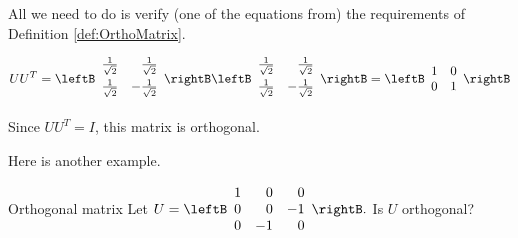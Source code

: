 \begin{solution}
All we need to do is verify (one of the equations from) the requirements of Definition \ref{def:OrthoMatrix}.

\begin{equation*}
UU^{T}=\leftB 
\begin{array}{rr}
\vspace{0.05in}\frac{1}{\sqrt{2}} & \frac{1}{\sqrt{2}} \\ 
\vspace{0.05in}\frac{1}{\sqrt{2}} & -\frac{1}{\sqrt{2}}
\end{array}
\rightB \leftB 
\begin{array}{rr}
\vspace{0.05in}\frac{1}{\sqrt{2}} & \frac{1}{\sqrt{2}} \\ 
\vspace{0.05in}\frac{1}{\sqrt{2}} & -\frac{1}{\sqrt{2}}
\end{array}
\rightB =\allowbreak \leftB 
\begin{array}{cc}
1 & 0 \\ 
0 & 1
\end{array}
\rightB 
\end{equation*}

Since $UU^{T} = I$, this matrix is orthogonal.
\end{solution}

Here is another example.

\begin{example}{Orthogonal matrix}{}
Let $U=\leftB
\begin{array}{rrr}
1 & 0 & 0 \\
0 & 0 & -1 \\
0 & -1 & 0
\end{array}
\rightB .$ Is $U$ orthogonal?
\end{example}

